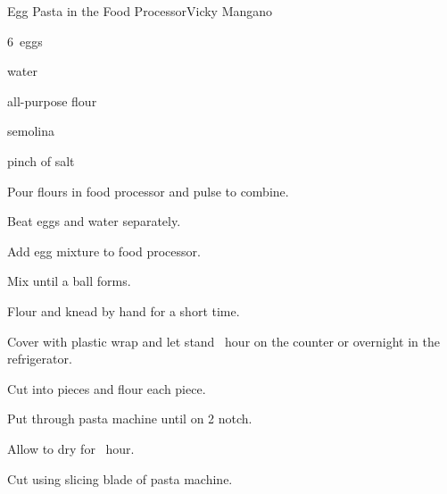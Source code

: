 \begin{recipe}{Egg Pasta in the Food Processor}{Vicky Mangano}{}

\begin{ingredients}
\item 6~eggs
\item \C{\quarter} water
\item {} all-purpose flour
\item {} semolina
\item pinch of salt
\end{ingredients}

\begin{directions}
\item Pour flours in food processor and pulse to combine.
\item Beat eggs and water separately.
\item Add egg mixture to food processor.
\item Mix until a ball forms.
\item Flour and knead by hand for a short time.
\item Cover with plastic wrap and let stand \half~hour on the counter or overnight in the refrigerator.
\item Cut into pieces and flour each piece.
\item Put through pasta machine until on 2 notch.
\item Allow to dry for \half~hour.
\item Cut using slicing blade of pasta machine.
\end{directions}

\end{recipe}
